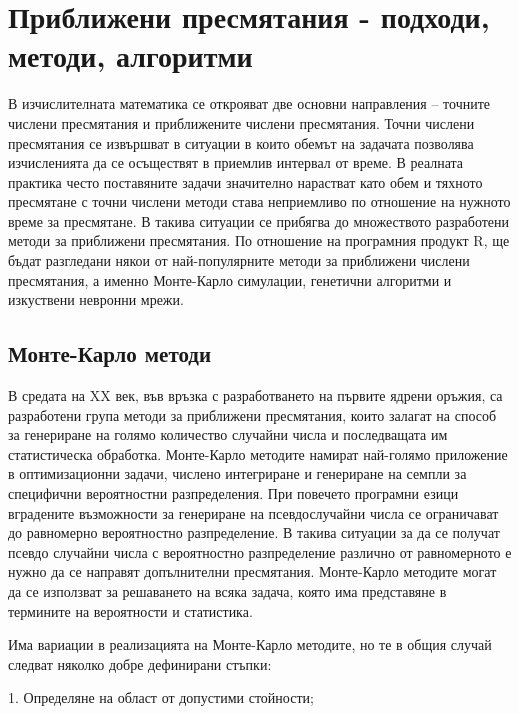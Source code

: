 \newpage
\chapter{Приближени пресмятания - подходи, методи, алгоритми}
\label{chapter10}
\thispagestyle{empty}

В изчислителната математика се открояват две основни направления – точните числени пресмятания и приближените числени пресмятания. Точни числени пресмятания се извършват в ситуации в които обемът на задачата позволява изчисленията да се осъществят в приемлив интервал от време. В реалната практика често поставяните задачи значително нарастват като обем и тяхното пресмятане с точни числени методи става неприемливо по отношение на нужното време за пресмятане. В такива ситуации се прибягва до множеството разработени методи за приближени пресмятания. По отношение на програмния продукт R, ще бъдат разгледани някои от най-популярните методи за приближени числени пресмятания, а именно Монте-Карло симулации\cite{montecarlo}, генетични алгоритми\cite{ga} и изкуствени невронни мрежи\cite{ann}.

\section{Монте-Карло методи}

В средата на XX век, във връзка с разработването на първите ядрени оръжия, са разработени група методи за приближени пресмятания, които залагат на способ за генериране на голямо количество случайни числа и последващата им статистическа обработка. Монте-Карло методите намират най-голямо приложение в оптимизационни задачи, числено интегриране и генериране на семпли за специфични вероятностни разпределения. При повечето програмни езици вградените възможности за генериране на псевдослучайни числа се ограничават до равномерно вероятностно разпределение. В такива ситуации за да се получат псевдо случайни числа с вероятностно разпределение различно от равномерното е нужно да се направят допълнителни пресмятания. Монте-Карло методите могат да се използват за решаването на всяка задача, която има представяне в термините на вероятности и статистика. 

Има вариации в реализацията на Монте-Карло методите, но те в общия случай следват няколко добре дефинирани стъпки:

1. Определяне на област от допустими стойности;

